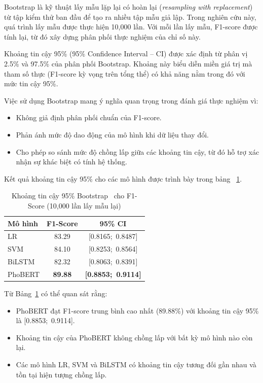 \documentclass[12pt, a4paper]{report}
\newcommand{\phobertFone}{89.88}
\newcommand{\lrFone}{83.29}
\newcommand{\svmFone}{84.10}
\newcommand{\bilstmFone}{82.32}
\newcommand{\lrFoneCI}{[0.8165;\ 0.8487]}
\newcommand{\svmFoneCI}{[0.8253;\ 0.8564]}
\newcommand{\bilstmFoneCI}{[0.8063;\ 0.8391]}
\newcommand{\phobertFoneCI}{[0.8853;\ 0.9114]}
\begin{document}
Bootstrap là kỹ thuật lấy mẫu lặp lại có hoàn lại 
(\textit{resampling with replacement}) từ tập kiểm thử ban đầu 
để tạo ra nhiều tập mẫu giả lập. Trong nghiên cứu này, quá trình 
lấy mẫu được thực hiện 10,000 lần. Với mỗi lần lấy mẫu, 
F1-score được tính lại, từ đó xây dựng phân phối thực nghiệm 
của chỉ số này.

Khoảng tin cậy 95\% (95\% Confidence Interval -- CI) được xác định 
từ phân vị 2.5\% và 97.5\% của phân phối Bootstrap. 
Khoảng này biểu diễn miền giá trị mà tham số thực 
(F1-score kỳ vọng trên tổng thể) có khả năng nằm trong đó 
với mức tin cậy 95\%.

Việc sử dụng Bootstrap mang ý nghĩa quan trọng trong đánh giá 
thực nghiệm vì:

\begin{itemize}
    \item Không giả định phân phối chuẩn của F1-score.
    \item Phản ánh mức độ dao động của mô hình khi dữ liệu thay đổi.
    \item Cho phép so sánh mức độ chồng lấp giữa các khoảng tin cậy, 
    từ đó hỗ trợ xác nhận sự khác biệt có tính hệ thống.
\end{itemize}

Kết quả khoảng tin cậy 95\% cho các mô hình được trình bày 
trong bảng ~\ref{tab:ci}.

\begin{table}[H]
\centering
\caption{Khoảng tin cậy 95\% Bootstrap~\cite{efron1979bootstrap} cho F1-Score (10,000 lần lấy mẫu lại)}
\label{tab:ci}
\begin{tabular}{lcc}
\toprule
\textbf{Mô hình} & \textbf{F1-Score} & \textbf{95\% CI} \\
\midrule
LR      & \lrFone  & \lrFoneCI{} \\
SVM     & \svmFone & \svmFoneCI{} \\
BiLSTM  & \bilstmFone & \bilstmFoneCI{} \\
PhoBERT & \textbf{\phobertFone} & \textbf{\phobertFoneCI{}} \\
\bottomrule
\end{tabular}
\end{table}

Từ Bảng~\ref{tab:ci} có thể quan sát rằng:

\begin{itemize}
    \item PhoBERT đạt F1-score trung bình cao nhất (\phobertFone  \%)
    với khoảng tin cậy 95\% là {\phobertFoneCI{}}.
    
    \item Khoảng tin cậy của PhoBERT không chồng lấp với bất kỳ 
    mô hình nào còn lại.
    
    \item Các mô hình LR, SVM và BiLSTM có khoảng tin cậy tương đối 
    gần nhau và tồn tại hiện tượng chồng lấp.
\end{itemize}
\end{document}
